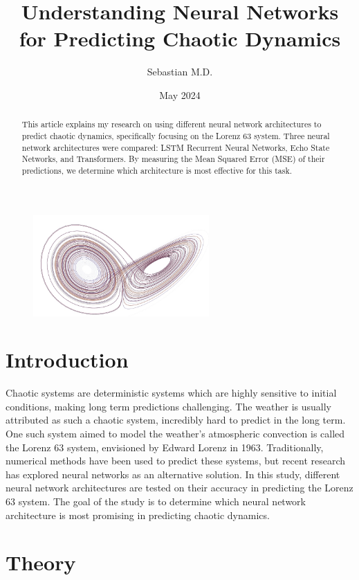 \documentclass[11pt]{article}
\title{Understanding Neural Networks for Predicting Chaotic Dynamics}
\author{Sebastian M.D.}
\date{May 2024}
\begin{document}
\maketitle

\begin{figure}[h]
\centering
\includegraphics[width=0.6\textwidth]{title_page_image.jpeg}
\end{figure}

\begin{abstract}
\noindent This article explains my research on using different neural network architectures to predict chaotic dynamics, specifically focusing on the Lorenz 63 system. Three neural network architectures were compared: LSTM Recurrent Neural Networks, Echo State Networks, and Transformers. By measuring the Mean Squared Error (MSE) of their predictions, we determine which architecture is most effective for this task.
\end{abstract}

\section{Introduction}

Chaotic systems are deterministic systems which are highly sensitive to initial conditions, making long term predictions challenging. The weather is usually attributed as such a chaotic system, incredibly hard to predict in the long term. One such system aimed to model the weather's atmospheric convection is called the Lorenz 63 system, envisioned by Edward Lorenz in 1963.  Traditionally, numerical methods have been used to predict these systems, but recent research has explored neural networks as an alternative solution. In this study, different neural network architectures are tested on their accuracy in predicting the Lorenz 63 system. The goal of the study is to determine which neural network architecture is most promising in predicting chaotic dynamics.

\section{Theory}
\end{document}
